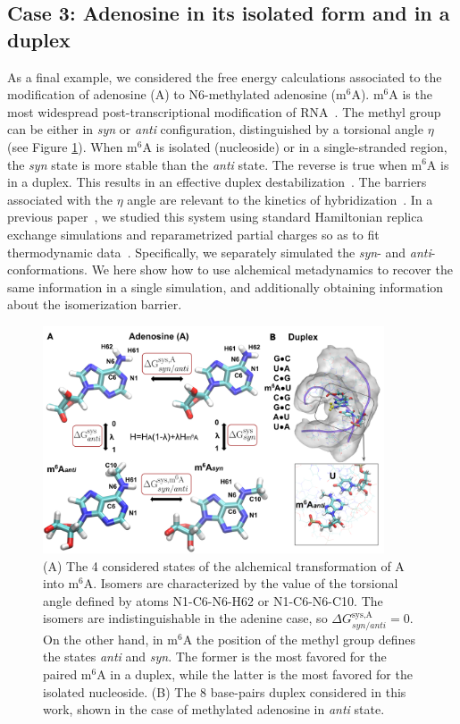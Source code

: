 \documentclass[journal=jacsat,manuscript=article]{achemso}
\begin{document}
\subsection{Case 3: Adenosine in its isolated form and in a duplex}
As a final example, we considered the free energy calculations associated to the modification of adenosine (A) to N6-methylated adenosine (m$^6$A). m$^6$A is the most widespread post-transcriptional modification of RNA~\cite{gilbert2016messenger}. The methyl group can be either in \emph{syn} or \emph{anti} configuration, distinguished by a torsional angle $\eta$ (see Figure \ref{sys3}). When m$^6$A is isolated (nucleoside) or in a single-stranded region, the \emph{syn} state is more stable than the \emph{anti} state. The reverse is true when m$^6$A is in a duplex. This results in an effective duplex destabilization~\cite{roost2015structure}. The barriers associated with the $\eta$ angle are relevant to the kinetics of hybridization~\cite{liu2021quantitative}. In a previous paper~\cite{piomponi2022molecular}, we studied this system using standard Hamiltonian replica exchange simulations and reparametrized partial charges so as to fit thermodynamic data~\cite{roost2015structure, kierzek2022secondary}. Specifically, we separately simulated the \emph{syn}- and \emph{anti}- conformations. We here show how to use alchemical metadynamics to recover the same information in a single simulation, and additionally obtaining information about the isomerization barrier.

\begin{figure}[ht]
    \centering
    \includegraphics[width=0.9\textwidth]{Figures/sys3_modified.png}   
    \caption{(A) The 4 considered states of the alchemical transformation of A into m$^6$A. Isomers are characterized by the value of the torsional angle defined by atoms N1-C6-N6-H62 or N1-C6-N6-C10. The isomers are indistinguishable in the adenine case, so $\Delta G^{\text{sys,A}}_{syn/anti}=0$. On the other hand, in m$^6$A the position of the methyl group defines the states \emph{anti} and \emph{syn}. The former is the most favored for the paired m$^6$A in a duplex, while the latter is the most favored for the isolated nucleoside. (B) The 8 base-pairs duplex considered in this work, shown in the case of methylated adenosine in \emph{anti} state.}
    \label{sys3}
\end{figure}
\end{document}

